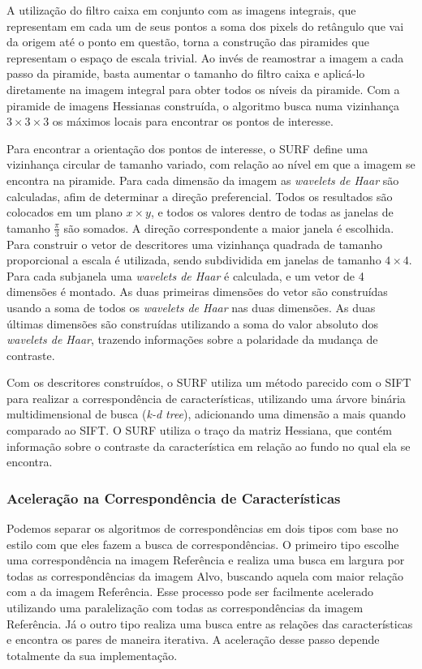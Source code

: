   A utilização do filtro caixa em conjunto com as imagens integrais, que representam em cada um de seus pontos a soma
dos pixels do retângulo que vai da origem até o ponto em questão, torna a construção das piramides que representam o
espaço de escala trivial. Ao invés de reamostrar a imagem a cada passo da piramide, basta aumentar o tamanho do filtro
caixa e aplicá-lo diretamente na imagem integral para obter todos os níveis da piramide. Com a piramide de imagens
Hessianas construída, o algoritmo busca numa vizinhança $3 \times 3 \times 3$ os máximos locais para encontrar os
pontos de interesse.

  Para encontrar a orientação dos pontos de interesse, o SURF define uma vizinhança circular de tamanho variado, com
relação ao nível em que a imagem se encontra na piramide. Para cada dimensão da imagem as \textit{wavelets de Haar} são
calculadas, afim de determinar a direção preferencial. Todos os resultados são colocados em um plano $x \times y$, e
todos os valores dentro de todas as janelas de tamanho $\frac{\pi}{3}$ são somados. A direção correspondente a maior
janela é escolhida. Para construir o vetor de descritores uma vizinhança quadrada de tamanho proporcional a escala é
utilizada, sendo subdividida em janelas de tamanho $4 \times 4$. Para cada subjanela uma \textit{wavelets de Haar} é
calculada, e um vetor de 4 dimensões é montado. As duas primeiras dimensões do vetor são construídas usando a soma de
todos os \textit{wavelets de Haar} nas duas dimensões. As duas últimas dimensões são construídas utilizando a soma do
valor absoluto dos \textit{wavelets de Haar}, trazendo informações sobre a polaridade da mudança de contraste.

  Com os descritores construídos, o SURF utiliza um método parecido com o SIFT para realizar a correspondência de
características, utilizando uma árvore binária multidimensional de busca (\textit{k-d tree}), adicionando uma dimensão a
mais quando comparado ao SIFT. O SURF utiliza o traço da matriz Hessiana, que contém informação sobre o contraste da
característica em relação ao fundo no qual ela se encontra.

\subsubsection{Aceleração na Correspondência de Características}

    Podemos separar os algoritmos de correspondências em dois tipos com base no estilo com que eles fazem a busca de
correspondências. O primeiro tipo escolhe uma correspondência na imagem Referência e realiza uma busca em largura por
todas as correspondências da imagem Alvo, buscando aquela com maior relação com a da imagem Referência. Esse processo
pode ser facilmente acelerado utilizando uma paralelização com todas as correspondências da imagem Referência. Já o
outro tipo realiza uma busca entre as relações das características e encontra os pares de maneira iterativa. A
aceleração desse passo depende totalmente da sua implementação.

